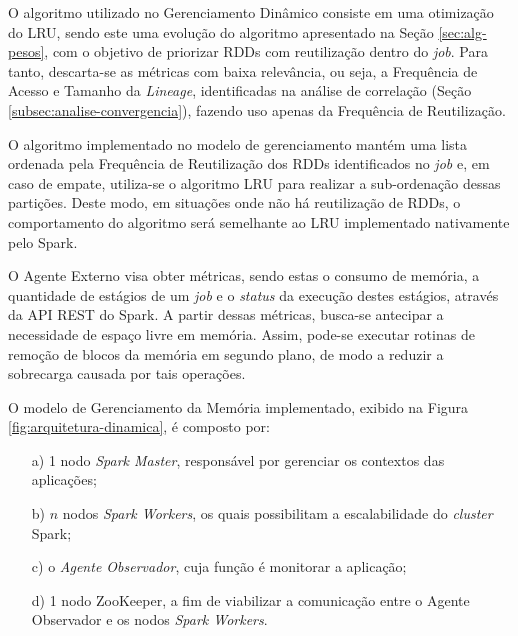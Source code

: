 O algoritmo utilizado no Gerenciamento Dinâmico consiste em uma otimização do LRU, sendo este uma evolução do algoritmo apresentado na Seção \ref{sec:alg-pesos}, com o objetivo de priorizar RDDs com reutilização dentro do \textit{job}. Para tanto, descarta-se as métricas com baixa relevância, ou seja, a Frequência de Acesso e Tamanho da \textit{Lineage}, identificadas na análise de correlação (Seção \ref{subsec:analise-convergencia}), fazendo uso apenas da Frequência de Reutilização. 

O algoritmo implementado no modelo de gerenciamento mantém uma lista ordenada pela Frequência de Reutilização dos RDDs identificados no \textit{job} e, em caso de empate, utiliza-se o algoritmo LRU para realizar a sub-ordenação dessas partições. Deste modo, em situações onde não há reutilização de RDDs, o comportamento do algoritmo será semelhante ao LRU implementado nativamente pelo Spark.

O Agente Externo visa obter métricas, sendo estas o consumo de memória, a quantidade de estágios de um \textit{job} e o \textit{status} da execução destes estágios, através da API REST do Spark. A partir dessas métricas, busca-se antecipar a necessidade de espaço livre em memória. Assim, pode-se executar rotinas de remoção de blocos da memória em segundo plano, de modo a reduzir a sobrecarga causada por tais operações.

O modelo de Gerenciamento da Memória implementado, exibido na Figura \ref{fig:arquitetura-dinamica}, é composto por:
\begin{enumerate}
	\item[a)] 1 nodo \textit{Spark Master}, responsável por gerenciar os contextos das aplicações;
	\item[b)] $n$ nodos \textit{Spark Workers}, os quais possibilitam a escalabilidade do \textit{cluster} Spark;
	\item[c)] o \textit{Agente Observador}, cuja função é monitorar a aplicação;
	\item[d)] 1 nodo ZooKeeper, a fim de viabilizar a comunicação entre o Agente Observador e os nodos \textit{Spark Workers}.
\end{enumerate}

